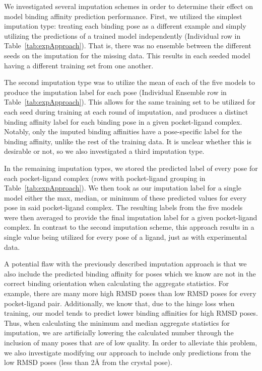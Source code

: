 \documentclass[journal=jcim,manuscript=article]{achemso}
\begin{document}
We investigated several imputation schemes in order to determine their effect on model binding affinity prediction performance.
First, we utilized the simplest imputation type: treating each binding pose as a different example and simply utilizing the predictions of a trained model independently (Individual row in Table~\ref{tab:expApproach}).
That is, there was no ensemble between the different seeds on the imputation for the missing data.
This results in each seeded model having a different training set from one another.

The second imputation type was to utilize the mean of each of the five models to produce the imputation label for each pose (Individual Ensemble row in Table~\ref{tab:expApproach}).
This allows for the same training set to be utilized for each seed during training at each round of imputation, and produces a distinct binding affinity label for each binding pose in a given pocket-ligand complex.
Notably, only the imputed binding affinities have a pose-specific label for the binding affinity, unlike the rest of the training data.
It is unclear whether this is desirable or not, so we also investigated a third imputation type.

In the remaining imputation types, we stored the predicted label of every pose for each pocket-ligand complex (rows with pocket-ligand grouping in Table~\ref{tab:expApproach}).
We then took as our imputation label for a single model either the max, median, or minimum of these predicted values for every pose in said pocket-ligand complex.
The resulting labels from the five models were then averaged to provide the final imputation label for a given pocket-ligand complex.
In contrast to the second imputation scheme, this approach results in a single value being utilized for every pose of a ligand, just as with experimental data.

A potential flaw with the previously described imputation approach is that we also include the predicted binding affinity for poses which we know are not in the correct binding orientation when calculating the aggregate statistics.
For example, there are many more high RMSD poses than low RMSD poses for every pocket-ligand pair.
Additionally, we know that, due to the hinge loss when training, our model tends to predict lower binding affinities for high RMSD poses. \cite{crossdocked2020}
Thus, when calculating the minimum and median aggregate statistics for imputation, we are artificially lowering the calculated number through the inclusion of many poses that are of low quality.
In order to alleviate this problem, we also investigate modifying our approach to include only predictions from the low RMSD poses (less than 2{\AA} from the crystal pose).
\end{document}
